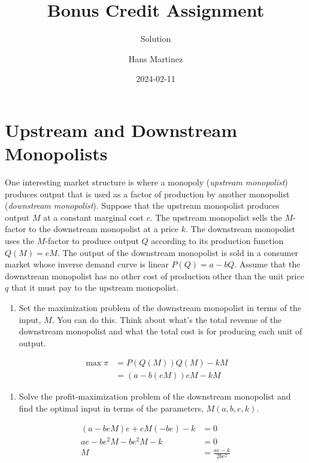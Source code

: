 \documentclass[
]{article}
\title{Bonus Credit Assignment}
\subtitle{Solution}
\author{Hans Martinez}
\date{2024-02-11}
\providecommand{\tightlist}{%
  \setlength{\itemsep}{0pt}\setlength{\parskip}{0pt}}\usepackage{longtable,booktabs,array}
\begin{document}
\maketitle

\section*{Upstream and Downstream
Monopolists}\label{upstream-and-downstream-monopolists}

One interesting market structure is where a monopoly (\emph{upstream
monopolist}) produces output that is used as a factor of production by
another monopolist (\emph{downstream monopolist}). Suppose that the
upstream monopolist produces output \(M\) at a constant marginal cost
\(c\). The upstream monopolist sells the \(M\)-factor to the downstream
monopolist at a price \(k\). The downstream monopolist uses the
\(M\)-factor to produce output \(Q\) according to its production
function \(Q(M)=eM\). The output of the downstream monopolist is sold in
a consumer market whose inverse demand curve is linear \(P(Q)=a-bQ\).
Assume that the downstream monopolist has no other cost of production
other than the unit price \(q\) that it must pay to the upstream
monopolist.

\begin{enumerate}
\def\labelenumi{\alph{enumi}.}
\tightlist
\item
  Set the maximization problem of the downstream monopolist in terms of
  the input, \(M\). You can do this. Think about what's the total
  revenue of the downstream monopolist and what the total cost is for
  producing each unit of output.
\end{enumerate}

\[
\begin{aligned}     
\max \pi &= P(Q(M))Q(M)-kM \\
        & = (a-b(eM))eM-kM
\end{aligned}
\]

\begin{enumerate}
\def\labelenumi{\alph{enumi}.}
\setcounter{enumi}{1}
\tightlist
\item
  Solve the profit-maximization problem of the downstream monopolist and
  find the optimal input in terms of the parameters, \(M(a,b,e,k)\).
\end{enumerate}

\[
\begin{aligned}
    (a-beM)e+eM(-be)-k&=0 \\
    ae-be^2M-be^2M-k&=0 \\
    M &=\frac{ae-k}{2be^2}
\end{aligned}
\]
\end{document}
